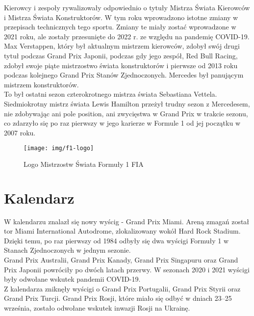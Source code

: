\documentclass[12pt]{article}
\begin{document}
Kierowcy i zespoły rywalizowały odpowiednio o tytuły Mistrza Świata Kierowców i Mistrza Świata Konstruktorów. W tym roku wprowadzono istotne zmiany w przepisach technicznych tego sportu. Zmiany te miały zostać wprowadzone w 2021 roku, ale zostały przesunięte do 2022 r. ze względu na pandemię COVID-19.\\ 

Max Verstappen, który był aktualnym mistrzem kierowców, zdobył swój drugi tytuł podczas Grand Prix Japonii, podczas gdy jego zespół, Red Bull Racing, zdobył swoje piąte mistrzostwo świata konstruktorów i pierwsze od 2013 roku podczas kolejnego Grand Prix Stanów Zjednoczonych. Mercedes był panującym mistrzem konstruktorów.\\

To był ostatni sezon czterokrotnego mistrza świata Sebastiana Vettela. Siedmiokrotny mistrz świata Lewis Hamilton przeżył trudny sezon z Mercedesem, nie zdobywając ani pole position, ani zwycięstwa w Grand Prix w trakcie sezonu, co zdarzyło się po raz pierwszy w jego karierze w Formule 1 od jej początku w 2007 roku.

\begin{figure}[ht]
    \centering
    \texttt{[image: img/f1-logo]}
    \caption{Logo Mistrzostw Świata Formuły 1 FIA}
    \label{fig:logo-f1}
\end{figure}

\newpage
\section{Kalendarz}

W kalendarzu znalazł się nowy wyścig - Grand Prix Miami. Areną zmagań został tor Miami International Autodrome, zlokalizowany wokół Hard Rock Stadium. Dzięki temu, po raz pierwszy od 1984 odbyły się dwa wyścigi Formuły 1 w Stanach Zjednoczonych w jednym sezonie.\\
Grand Prix Australii, Grand Prix Kanady, Grand Prix Singapuru oraz Grand Prix Japonii powróciły po dwóch latach przerwy. W sezonach 2020 i 2021 wyścigi były odwołane wskutek pandemii COVID-19.\\
Z kalendarza zniknęły wyścigi o Grand Prix Portugalii, Grand Prix Styrii oraz Grand Prix Turcji. Grand Prix Rosji, które miało się odbyć w dniach 23–25 września, zostało odwołane wskutek inwazji Rosji na Ukrainę.
\end{document}
